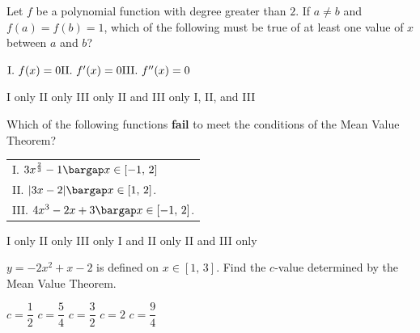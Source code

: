 \begin{questions}
    \question Let $f$ be a polynomial function with degree greater than $2$. If $a \neq b$ and $f(a) = f(b) = 1$, which of the following must be true of at least one value of $x$ between $a$ and $b$? \begin{center}
        $\hfill \text{I. $f(x) = 0$} \hfill \text{II. $f'(x) = 0$} \hfill \text{III. $f''(x) = 0$} \hfill$
    \end{center} \vspace{11pt}

    \begin{oneparchoices}
        \choice I only 
        \choice II only
        \choice III only 
        \choice II and III only
        \choice I, II, and III
    \end{oneparchoices} \par \horizontalline

    \question Which of the following functions \textbf{fail} to meet the conditions of the Mean Value Theorem? \begin{center}
        \begin{tabular}{l}
            I. $3x^{\frac{2}{3}} - 1 \bargap x \in [-1, \, 2]$ \\[11pt]
            II. $|3x - 2| \bargap x \in [1, \, 2]$. \\[11pt]
            III. $4x^3 - 2x + 3 \bargap x \in [-1, \, 2]$.
        \end{tabular}
    \end{center} \vspace{11pt}

    \begin{oneparchoices}
        \choice I only 
        \choice II only
        \choice III only 
        \choice I and II only
        \choice II and III only
    \end{oneparchoices} \par \horizontalline

    \question $y = -2x^2 + x - 2$ is defined on $x \in [1, \, 3]$. Find the $c$-value determined by the Mean Value Theorem. \\

    \begin{oneparchoices}
        \choice $c = \dfrac{1}{2}$
        \choice $c = \dfrac{5}{4}$
        \choice $c = \dfrac{3}{2}$
        \choice $c = 2$
        \choice $c = \dfrac{9}{4}$
    \end{oneparchoices} \par \horizontalline


\end{questions}
